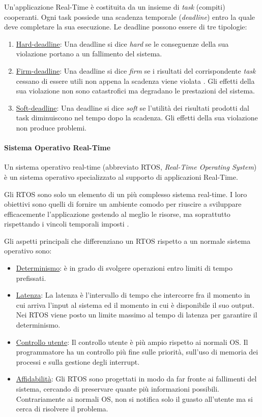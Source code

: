 Un'applicazione Real-Time è costituita da un insieme di \textit{task} (compiti) cooperanti. Ogni task possiede una scadenza temporale (\textit{deadline}) entro la quale deve completare la sua esecuzione. Le deadline possono essere di tre tipologie:
\begin{enumerate}
	\item \underline{Hard-deadline}: Una deadline si dice \textit{hard} se le conseguenze della sua violazione portano a un fallimento del sistema.
	\item \underline{Firm-deadline}: Una deadline si dice \textit{firm} se i risultati del corrispondente \textit{task} cessano di essere utili non appena la scadenza viene violata \cite{259423}. Gli effetti della sua violazione non sono catastrofici ma degradano le prestazioni del sistema.
	\item \underline{Soft-deadline}: Una deadline si dice \textit{soft} se l'utilità dei risultati prodotti dal task diminuiscono nel tempo dopo la scadenza. Gli effetti della sua violazione non produce problemi.
\end{enumerate}

\paragraph{Sistema Operativo Real-Time}
Un sistema operativo real-time (abbreviato RTOS, \textit{Real-Time Operating System}) è un sistema operativo specializzato al supporto di applicazioni Real-Time.

Gli RTOS sono solo un elemento di un più complesso sistema real-time. I loro obiettivi sono quelli di fornire un ambiente comodo per riuscire a sviluppare efficacemente l'applicazione gestendo al meglio le risorse, ma soprattutto rispettando i vincoli temporali imposti \cite{fornacia}.

Gli aspetti principali che differenziano un RTOS rispetto a un normale sistema operativo sono:
\begin{itemize}
	\item \underline{Determinismo}: è in grado di svolgere operazioni entro limiti di tempo prefissati.
	\item \underline{Latenza}: La latenza è l'intervallo di tempo che intercorre fra il momento in cui arriva l'input al sistema ed il momento in cui è disponibile il suo output. Nei RTOS viene posto un limite massimo al tempo di latenza per garantire il determinismo.
	\item \underline{Controllo utente}: Il controllo utente è più ampio rispetto ai normali OS. Il programmatore ha un controllo più fine sulle priorità, sull'uso di memoria dei processi e sulla gestione degli interrupt.
	\item \underline{Affidabilità}: Gli RTOS sono progettati in modo da far fronte ai fallimenti del sistema, cercando di preservare quante più informazioni possibili. Contrariamente ai normali OS, non si notifica solo il guasto all'utente ma si cerca di risolvere il problema.
\end{itemize}

